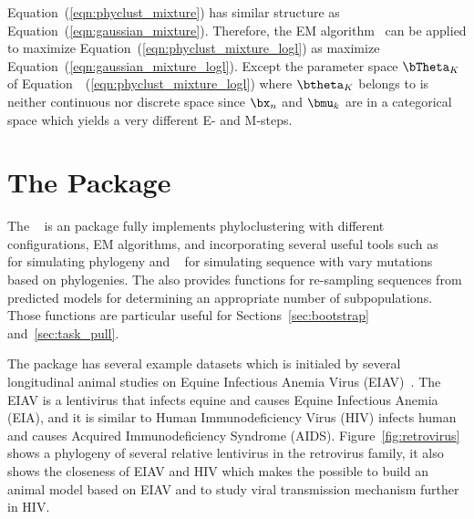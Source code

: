 \begin{enumerate}
\end{enumerate}

Equation~(\ref{eqn:phyclust_mixture}) has similar structure
as Equation~(\ref{eqn:gaussian_mixture}). Therefore, the
EM algorithm~\citep{Dempster1977}
can be applied to maximize Equation~(\ref{eqn:phyclust_mixture_logl})
as maximize Equation~(\ref{eqn:gaussian_mixture_logl}).
Except the parameter space $\bTheta_K$ of
Equation~~(\ref{eqn:phyclust_mixture_logl}) where $\btheta_K$ belongs to
is neither continuous nor discrete space since $\bx_n$ and $\bmu_k$ are
in a categorical space which yields a very different E- and M-steps.


\section{The  Package}
\label{sec:phyclust}

The ~\citep{Chen2011a}
is an  package fully implements
phyloclustering with different configurations, EM algorithms, and
incorporating several useful tools such as ~\citep{Hudson2002}
for simulating phylogeny and ~\citep{Rambaut1997}
for simulating sequence with vary mutations based on phylogenies.
The  also provides functions for re-sampling sequences from
predicted models for determining an appropriate number of subpopulations.
Those functions are particular useful for Sections~\ref{sec:bootstrap}
and~\ref{sec:task_pull}.

The  package has several example datasets which is initialed by
several longitudinal animal studies on Equine Infectious Anemia
Virus (EIAV)~\citep{Leroux2004}.
The EIAV is a lentivirus that
infects equine and causes Equine Infectious Anemia (EIA), and it is similar
to Human Immunodeficiency Virus (HIV) infects human and causes Acquired
Immunodeficiency Syndrome (AIDS).
Figure~\ref{fig:retrovirus}~\citep{Weiss2006}
shows a phylogeny of several relative lentivirus
in the retrovirus family, it also shows the closeness of EIAV and HIV which
makes the possible to build an animal model based on EIAV and to study
viral transmission mechanism further in HIV.

